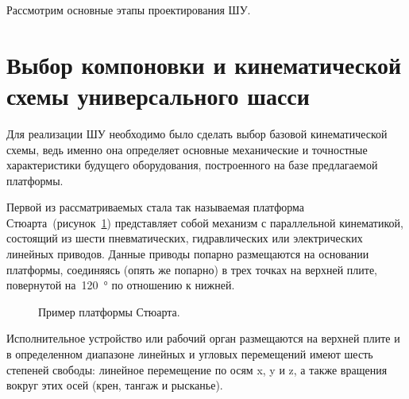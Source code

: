 Рассмотрим основные этапы проектирования ШУ.

\section{Выбор компоновки и кинематической схемы универсального шасси}

Для реализации ШУ необходимо было сделать выбор базовой кинематической схемы, ведь именно она определяет основные механические и точностные характеристики будущего оборудования, построенного на базе предлагаемой платформы.

Первой из рассматриваемых стала так называемая платформа Стюарта~(рисунок~\cref{fig:stuart}) представляет собой механизм с параллельной кинематикой, состоящий из шести пневматических, гидравлических или электрических линейных приводов. Данные приводы попарно размещаются на основании платформы, соединяясь (опять же попарно) в трех точках на верхней плите, повернутой на~\SI{120}{\degree} по отношению к нижней.

\begin{figure}[ht]
	\caption{Пример платформы Стюарта.}\label{fig:stuart}
\end{figure}

Исполнительное устройство или рабочий орган размещаются на верхней плите и в определенном диапазоне линейных и угловых перемещений имеют шесть степеней свободы: линейное перемещение по осям x, y и z, а также вращения вокруг этих осей (крен, тангаж и рысканье).


